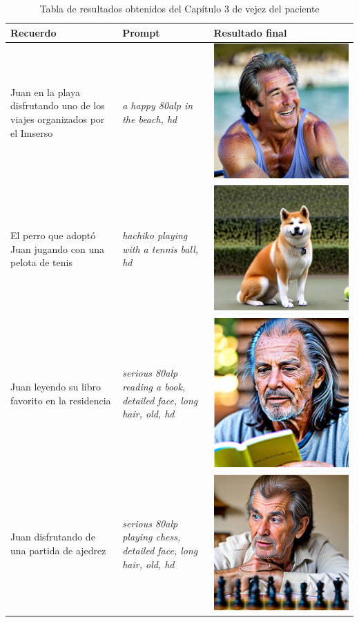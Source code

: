 \begin{table}
	\centering
	\begin{tabular}{>{\centering\arraybackslash}m{5cm} >{\arraybackslash}m{5cm}>{\arraybackslash}m{5cm}}
		\textbf{Recuerdo} & \textbf{Prompt} & \textbf{Resultado final} \\
		\hline
		Juan en la playa disfrutando uno de los viajes organizados por el Imserso & \textit{a happy 80alp in the beach, hd} & \includegraphics[width = 0.3
		\textwidth]{Imagenes/Vectorial/80alplaya.png}\\
		\hline
		El perro que adoptó Juan jugando con una pelota de tenis & \textit{hachiko playing with a tennis ball, hd} & \includegraphics[width = 0.3
		\textwidth]{Imagenes/Vectorial/hachitennis.png}\\
		\hline
		 Juan leyendo su libro favorito en la residencia & \textit{serious 80alp reading a book, detailed face, long hair, old, hd} & \includegraphics[width = 0.3
		\textwidth]{Imagenes/Vectorial/80alpbook.png}\\
		\hline	
		Juan disfrutando de una partida de ajedrez & \textit{serious 80alp playing chess, detailed face, long hair, old, hd} & \includegraphics[width = 0.3
		\textwidth]{Imagenes/Vectorial/80alpchess.png}\\
		\hline	
	\end{tabular}
	\caption{Tabla de resultados obtenidos del Capítulo 3 de vejez del paciente}
	\label{tab:capitulo3librovida}
\end{table}

